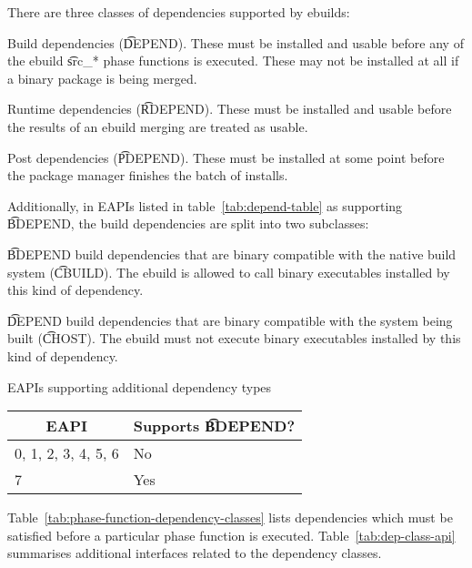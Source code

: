 There are three classes of dependencies supported by ebuilds:

\begin{compactitem}
\item Build dependencies (\t{DEPEND}). These must be installed and usable before any of
    the ebuild \t{src_*} phase functions is executed. These may not be installed at all
    if a binary package is being merged.
\item Runtime dependencies (\t{RDEPEND}). These must be installed and usable before
    the results of an ebuild merging are treated as usable.
\item Post dependencies (\t{PDEPEND}). These must be installed at some point before
    the package manager finishes the batch of installs.
\end{compactitem}

 Additionally, in EAPIs listed in table~\ref{tab:depend-table}
as supporting \t{BDEPEND}, the build dependencies are split into two subclasses:

\begin{compactitem}
\item \t{BDEPEND} build dependencies that are binary compatible with the native build system
    (\t{CBUILD}). The ebuild is allowed to call binary executables installed by this kind of
    dependency.
    \item \t{DEPEND} build dependencies that are binary compatible with the system being built
    (\t{CHOST}). The ebuild must not execute binary executables installed by this kind of
    dependency.
\end{compactitem}

\begin{centertable}{EAPIs supporting additional dependency types}
    \label{tab:depend-table}
    \begin{tabular}{ll}
      \toprule
      \multicolumn{1}{c}{\textbf{EAPI}} &
      \multicolumn{1}{c}{\textbf{Supports \t{BDEPEND}?}} \\
      \midrule
      0, 1, 2, 3, 4, 5, 6 & No  \\
      7                   & Yes \\
      \bottomrule
    \end{tabular}
\end{centertable}

Table~\ref{tab:phase-function-dependency-classes} lists dependencies which must be satisfied before
a particular phase function is executed. Table~\ref{tab:dep-class-api} summarises additional
interfaces related to the dependency classes.

